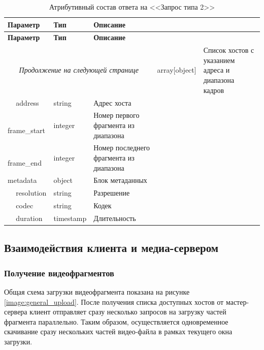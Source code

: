 \begin{longtable}{|p{4cm}|p{3cm}|p{8.5cm}|}
	\caption{Атрибутивный состав ответа на <<Запрос типа 2>>}\label{tbl:complaint_response}\\
	\hline
	
	\textbf{Параметр} & \textbf{Тип} & \textbf{Описание}\\ 
	\hline
	\endfirsthead
	
	\hline
	\textbf{Параметр} & \textbf{Тип} & \textbf{Описание}\\ 
	\hline
	\endhead
	
	\hline
	\multicolumn{3}{c}{\textit{Продолжение на следующей странице}}
	\endfoot
	\hline
	\endlastfoot
	
	hosts & 
	array[object] & 
	Список хостов с указанием адреса и диапазона кадров \\
	
	\hline
	\,\,\,\,\,\,\,address & 
	string & 
	Адрес хоста \\
	
	\hline
	\,\,\,\,\,\,\,frame\_start & 
	integer & 
	Номер первого фрагмента из диапазона \\
	
	\hline
	\,\,\,\,\,\,\,frame\_end & 
	integer & 
	Номер последнего фрагмента из диапазона \\
	
	\hline
	metadata & 
	object & 
	Блок метаданных \\
	
	\hline
	\,\,\,\,\,\,\,resolution & 
	string & 
	Разрешение \\
	
	\hline
	\,\,\,\,\,\,\,codec & 
	string & 
	Кодек \\
	
	\hline
	\,\,\,\,\,\,\,duration & 
	timestamp & 
	Длительность \\
\end{longtable}

\subsection{Взаимодействия клиента и медиа-сервером}
\subsubsection{Получение видеофрагментов}
Общая схема загрузки видеофрагмента показана на рисунке \ref{image:general_upload}. После получения списка доступных хостов от мастер-сервера клиент отправляет сразу несколько запросов на загрузку частей фрагмента параллельно. Таким образом, осуществляется одновременное скачивание сразу нескольких частей видео-файла в рамках текущего окна загрузки. 

